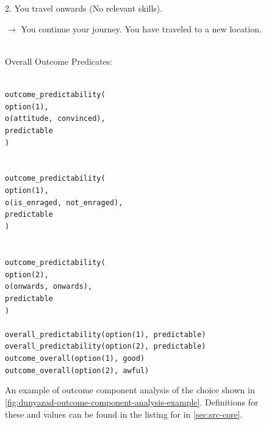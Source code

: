 \begin{enumerate}[leftmargin=1.4em]
\begin{figure}[!p]
{{{\begin{hangparas}{1.3em}{1}
2. You travel onwards (No relevant skills). \\
\ind \parbox{0.95\linewidth}{$\rightarrow$ You continue your journey. You have traveled to a new location.}
\end{hangparas}
} \vind \\
Overall Outcome Predicates:\svind \\
\ind \parbox{0.9\textwidth}{ \tt
{} \\
\ind outcome\_predictability( \\
\ind \ind option(1), \\
\ind \ind o(attitude, convinced), \\
\ind \ind predictable \\
\ind ) \\
 \\
 \\
\ind outcome\_predictability( \\
\ind \ind option(1), \\
\ind \ind o(is\_enraged, not\_enraged), \\
\ind \ind predictable \\
\ind ) \\
 \\
 \\
\ind outcome\_predictability( \\
\ind \ind option(2), \\
\ind \ind o(onwards, onwards), \\
\ind \ind predictable \\
\ind ) \\
 \\
 overall\_predictability(option(1), predictable) \\
 overall\_predictability(option(2), predictable) \\
 outcome\_overall(option(1), good) \\
 outcome\_overall(option(2), awful) \\
}
}
}
\caption[\dunyazad/ outcome component analysis example]{An example of outcome component analysis of the choice shown in \cref{fig:dunyazad-outcome-component-analysis-example}. Definitions for these   and  values can be found in the listing for  in \cref{sec:src-core}.}
\label{fig:dunyazad-full-outcome-analysis-example}
\end{figure}



\end{enumerate}

